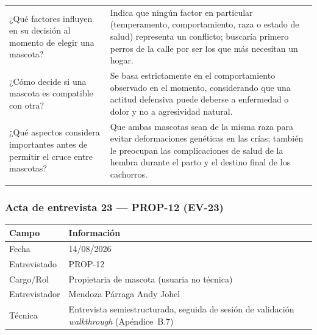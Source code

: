 \documentclass[journal,onecolumn]{IEEEtran}
\begin{document}
{\begin{longtable}{@{}p{5.6cm} p{9.4cm}@{}}
			¿Qué factores influyen en su decisión al momento de elegir una mascota? & Indica que ningún factor en particular (temperamento, comportamiento, raza o estado de salud) representa un conflicto; buscaría primero perros de la calle por ser los que más necesitan un hogar. \\ \addlinespace
			
			¿Cómo decide si una mascota es compatible con otra? & Se basa estrictamente en el comportamiento observado en el momento, considerando que una actitud defensiva puede deberse a enfermedad o dolor y no a agresividad natural. \\ \addlinespace
			
			¿Qué aspectos considera importantes antes de permitir el cruce entre mascotas? & Que ambas mascotas sean de la misma raza para evitar deformaciones genéticas en las crías; también le preocupan las complicaciones de salud de la hembra durante el parto y el destino final de los cachorros. \\ \addlinespace
			
		\end{longtable}
	}

	\subsubsection*{Acta de entrevista 23 --- PROP-12 (EV-23)}

	\begin{table}[H]
		\centering\small
		\begin{tabularx}{\textwidth}{@{}l X@{}}
			\toprule
			\textbf{Campo} & \textbf{Información} \\
			\midrule
			
			Fecha & 14/08/2026 \\
			
			Entrevistado & PROP-12 \\
			
			Cargo/Rol & Propietaria de mascota (usuaria no técnica) \\
			
			Entrevistador & Mendoza Párraga Andy Johel \\
			
			Técnica & Entrevista semiestructurada, seguida de sesión de validación \emph{walkthrough} (Apéndice~B.7) \\
			
			\bottomrule
		\end{tabularx}
	\end{table}
\end{document}
